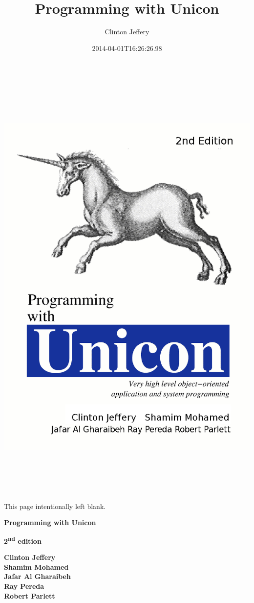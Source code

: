 \documentclass[letterpaper,twoside,12pt]{book}
\title{Programming with Unicon}
\author{Clinton Jeffery}
\date{2014-04-01T16:26:26.98}
\begin{document}
\thispagestyle{empty}
\setlength{\topmargin}{-0.05in}
\hspace{-0.5in}
\includegraphics[width=7.1in,height=8.76in]{ub-img/ub-img1.png}
\clearpage

\bigskip
This page intentionally left blank.
\clearpage

\vspace*{3\bigskipamount}
\begin{center}
  \bfseries\Huge
  Programming with Unicon
\end{center}
\bigskip
\bigskip
\begin{center}
  \bfseries\huge
  2\textsuperscript{nd} edition
\end{center}
\vspace*{7\bigskipamount}
\begin{flushright}\bfseries
Clinton Jeffery \\
Shamim Mohamed \\
Jafar Al Gharaibeh \\
Ray Pereda \\
Robert Parlett 
\end{flushright}
\clearpage
\end{document}
